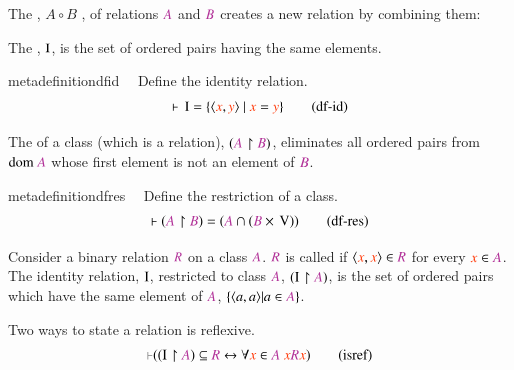 \pn The , $A\circ B$
, of relations $\mc{A}$ and $\mc{B}$ creates a new relation by combining them:
\dfco

\pn The , ${\rm I}$, is the set of ordered pairs having the same elements.
\begin{restatable}{metadefinition}{dfid}~~ Define the identity relation.  ~
\begin{align}
\vdash \,\mathrm{I} = \{ \langle \msc{x} , \msc{y} \rangle~\vert~\msc{x} = \msc{y}
    \}\label{eq:df-id}\tag{df-id}
\end{align}
\end{restatable}

\pn The  of a class (which is a relation), $( \mc{A} \restriction \mc{B} )$, eliminates all ordered pairs from $\mathrm{dom}~\mc{A}$ whose first element is not an element of $\mc{B}$.
\begin{restatable}{metadefinition}{dfres}~~ Define the restriction of a class. 
\begin{align}
\vdash ( \mc{A} \restriction \mc{B} ) = ( \mc{A} \cap ( \mc{B} \times
    \,\mathrm{V} ) )\label{eq:df-res}\tag{df-res}
\end{align}
\end{restatable}

\pn Consider a binary relation $\mc{R}$ on a class $\mc{A}$.  
$\mc{R}$ is called  if $\langle \msc{x},\msc{x}\rangle\in \mc{R}$ for every $\msc{x}\in \mc{A}$.
The identity relation, ${\rm I}$, restricted to class $\mc{A}$, $( {\rm I} \restriction \mc{A} )$, is the set of ordered pairs which have the same element of $\mc{A}$, 
$\{ \langle a,a \rangle \vert a \in \mc{A} \}$.
\begin{lemma} {Two ways to state a relation is reflexive.} 
\begin{align}
\mm{\vdash} ( ( {\rm I} \restriction \mc{A} ) \subseteq \mc{R} \leftrightarrow
    \forall \msc{x} \in \mc{A}~\msc{x} \mc{R} \msc{x} )\label{eq:isref}\tag{isref}
\end{align}
\end{lemma}

